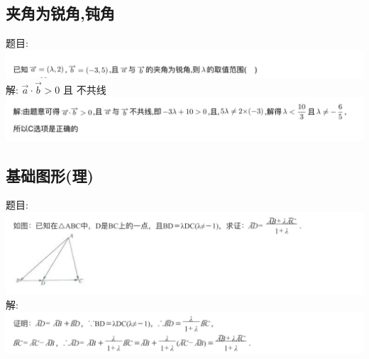 \documentclass[hyperref, UTF8,11pt,a4paper]{ctexart} %
\begin{document}
\subsection{夹角为锐角,钝角}
{\color{red}  题目: } \\
\includegraphics[width=500pt]  {pic/xiangliang/jiajiaotimu.jpg} \\
解: {\color{blue}  $\vec{a} \cdot \vec{b}>0$ 且 不共线} \\
\includegraphics[width=500pt]  {pic/xiangliang/jiajiaojieda.jpg} \\


\subsection{基础图形(理)}
{\color{red}  题目: } \\
\includegraphics[width=500pt]  {pic/xiangliang/jichutuxingtimu.jpg}  \\
解: \\
\includegraphics[width=500pt]  {pic/xiangliang/jichutuxingdaan.jpg} \\

\end{document}
